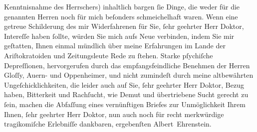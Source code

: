 \begin{ledgroupsized}[t]{13cm}
{{{                  Kenntnisnahme des Herrschers}}}\label{K_L01835-1h}) {\pb}inhaltlich bargen ſie Dinge, die weder für die genannten Herren noch für mich
               beſonders schmeichelhaft waren. Wenn eine getreue Schilderung des mir Widerfahrenen
               für Sie, ſehr geehrter Herr Doktor, Intereſſe haben ſollte, würden Sie mich aufs Neue
               verbinden, indem Sie mir geſtatten, Ihnen einmal mündlich über meine Erfahrungen im
               Lande der Ariſtokratoiden und Zeitungsleute Rede zu ſtehen. Starke pſychiſche
               Depreſſionen, hervorgerufen durch das empfangsfeindliche Benehmen der Herren Gloſſy, Auern- und Oppenheimer, und {\pb}nicht zumindeſt durch meine altbewährten
               Ungeſchicklichkeiten, die leider auch auf Sie, ſehr geehrter Herr Doktor, Bezug
               haben, Bitterkeit und Rachſucht, wie Demut und übertriebene Sucht gerecht zu ſein,
               machen die Abfaſſung eines vernünftigen Briefes zur Unmöglichkeit Ihrem Ihnen, ſehr
               geehrter Herr Doktor, nun auch noch für recht merkwürdige tragikomiſche Erlebniſſe
               dankbaren, ergebenſten\pend
           \pstart \spacefill\mbox{Albert Ehrenstein.}\pend{}
         
         \endnumbering{}\end{ledgroupsized}  \newcommand{\dateiname}{L01835}\newcommand{\titel}{Albert Ehrenstein an Arthur Schnitzler, 27. 3. 1909}\newcommand{\editorInnen}{Martin Anton Müller und Gerd-Hermann Susen}
      